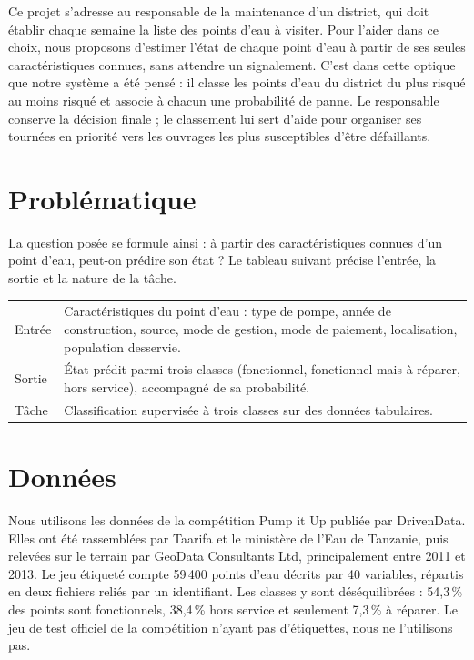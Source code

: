 \documentclass[10pt,a4paper]{article}
\begin{document}
Ce projet s'adresse au responsable de la maintenance d'un district, qui doit établir chaque semaine la liste des points d'eau à visiter. Pour l'aider dans ce choix, nous proposons d'estimer l'état de chaque point d'eau à partir de ses seules caractéristiques connues, sans attendre un signalement. C'est dans cette optique que notre système a été pensé : il classe les points d'eau du district du plus risqué au moins risqué et associe à chacun une probabilité de panne. Le responsable conserve la décision finale ; le classement lui sert d'aide pour organiser ses tournées en priorité vers les ouvrages les plus susceptibles d'être défaillants.

\section{Problématique}
La question posée se formule ainsi : à partir des caractéristiques connues d'un point d'eau, peut-on prédire son état ? Le tableau suivant précise l'entrée, la sortie et la nature de la tâche.

\begin{tabularx}{\textwidth}{@{}p{2.2cm}L@{}}
\toprule
Entrée & Caractéristiques du point d'eau : type de pompe, année de construction, source, mode de gestion, mode de paiement, localisation, population desservie. \\
Sortie & État prédit parmi trois classes (fonctionnel, fonctionnel mais à réparer, hors service), accompagné de sa probabilité. \\
Tâche & Classification supervisée à trois classes sur des données tabulaires. \\
\bottomrule
\end{tabularx}

\section{Données}
Nous utilisons les données de la compétition Pump it Up publiée par DrivenData. Elles ont été rassemblées par Taarifa et le ministère de l'Eau de Tanzanie, puis relevées sur le terrain par GeoData Consultants Ltd, principalement entre 2011 et 2013. Le jeu étiqueté compte 59\,400 points d'eau décrits par 40 variables, répartis en deux fichiers reliés par un identifiant. Les classes y sont déséquilibrées : 54,3\,\% des points sont fonctionnels, 38,4\,\% hors service et seulement 7,3\,\% à réparer. Le jeu de test officiel de la compétition n'ayant pas d'étiquettes, nous ne l'utilisons pas.
\end{document}
